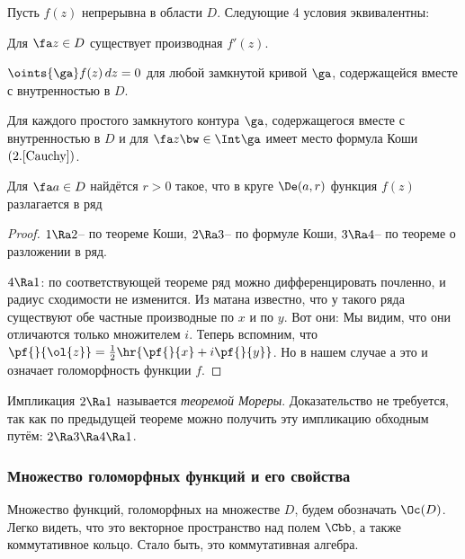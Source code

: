 \documentclass[a4paper]{article}
\begin{document}
\begin{theorem}
Пусть $f(z)$ непрерывна в области $D$. Следующие 4 условия эквивалентны:
\begin{nums}{-1}
\item Для $\fa z\in D$ существует производная $f'(z)$.
\item $\oints{\ga}f(z)\,dz=0$ для любой замкнутой кривой $\ga$, содержащейся вместе с внутренностью в $D$.
\item Для каждого простого замкнутого контура $\ga$, содержащегося вместе с внутренностью в $D$ и для $\fa z\bw\in \Int \ga$
имеет место формула Коши $(2.\ref{Cauchy})$.
\item Для $\fa a \in D$ найдётся $r > 0$ такое, что в круге $\De(a,r)$ функция $f(z)$ разлагается в ряд
\end{nums}
\end{theorem}
\begin{proof}
$1 \Ra 2$-- по теореме Коши, $2 \Ra 3$-- по формуле Коши, $3\Ra4$-- по теореме о разложении в ряд.

$4 \Ra 1$: по соответствующей теореме ряд можно дифференцировать почленно, и радиус сходимости не изменится.
Из матана известно, что у такого ряда существуют обе частные производные по $x$ и по $y$.
Вот они:
Мы видим, что они отличаются только множителем $i$. Теперь вспомним, что $\pf{}{\ol{z}}= \frac12\hr{\pf{}{x}+ i\pf{}{y}}$.
Но в нашем случае
а это и означает голоморфность функции $f$.
\end{proof}

\begin{note}
Импликация $2 \Ra 1$ называется \emph{теоремой Мореры}. Доказательство не требуется, так как по предыдущей теореме
можно получить эту импликацию обходным путём: $2 \Ra 3 \Ra 4 \Ra 1$.
\end{note}

\subsubsection{Множество голоморфных функций и его свойства}

Множество функций, голоморфных на множестве $D$, будем обозначать $\Oc(D)$.
Легко видеть, что это векторное пространство над полем $\Cbb$, а также коммутативное кольцо.
Стало быть, это коммутативная алгебра.
\end{document}
